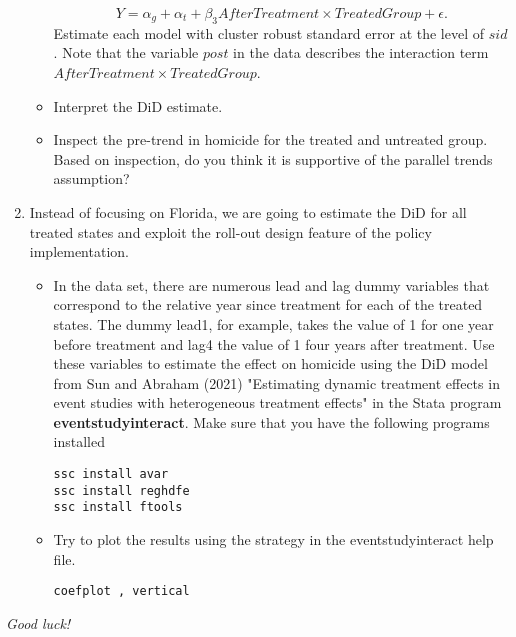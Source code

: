 \documentclass[12pt]{article}
\begin{document}
\begin{enumerate}
\begin{itemize}
\begin{equation}
Y = \alpha_g + \alpha_{t} + \beta_3 AfterTreatment \times TreatedGroup + \epsilon.
    \end{equation}
Estimate each model with cluster robust standard error at the level of $sid$. Note that the variable $post$ in the data describes the interaction term $AfterTreatment \times TreatedGroup$.
\item Interpret the DiD estimate.
\item Inspect the pre-trend in homicide for the treated and untreated group. Based on inspection, do you think it is supportive of the parallel trends assumption? 
\end{itemize}
\item Instead of focusing on Florida, we are going to estimate the DiD for all treated states and exploit the roll-out design feature of the policy implementation.
\begin{itemize}
\item In the data set, there are numerous lead and lag dummy variables that correspond to the relative year since treatment for each of the treated states. The dummy lead1, for example, takes the value of 1 for one year before treatment and lag4 the value of 1 four years after treatment. Use these variables to estimate the effect on homicide using the DiD model from Sun and Abraham (2021) "Estimating dynamic treatment effects in event studies with heterogeneous treatment effects" in the Stata program \textbf{eventstudyinteract}. Make sure that you have the following programs installed
\begin{verbatim}
ssc install avar
ssc install reghdfe
ssc install ftools
\end{verbatim}

\item Try to plot the results using the strategy in the eventstudyinteract help file.

\begin{verbatim}
coefplot , vertical
\end{verbatim}
\end{itemize}

\end{enumerate}

\emph{Good luck!}


 
\end{document}
